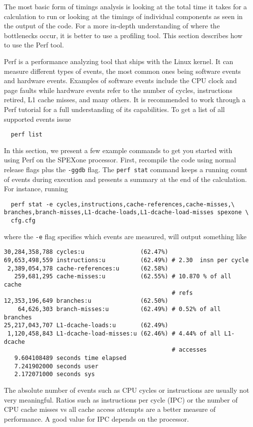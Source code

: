 \documentclass{article}
\begin{document}
The most basic form of timings analysis is looking at the total time it takes for a calculation to run or looking at the timings of individual components as seen in the output of the code. For a more in-depth understanding of where the bottlenecks occur, it is better to use a profiling tool. This section describes how to use the Perf tool.

Perf is a performance analyzing tool that ships with the Linux kernel. It can measure different types of events, the most common ones being software events and hardware events. Examples of software events include the CPU clock and page faults while hardware events refer to the number of cycles, instructions retired, L1 cache misses, and many others. It is recommended to work through a Perf tutorial for a full understanding of its capabilities. To get a list of all supported events issue
\begin{lstlisting}
  perf list
\end{lstlisting}
In this section, we present a few example commands to get you started with using Perf on the SPEXone processor. First, recompile the code using normal release flags plus the \lstinline!-ggdb! flag. The \lstinline!perf stat! command keeps a running count of events during execution and presents a summary at the end of the calculation. For instance, running
\begin{lstlisting}
  perf stat -e cycles,instructions,cache-references,cache-misses,\
branches,branch-misses,L1-dcache-loads,L1-dcache-load-misses spexone \
  cfg.cfg
\end{lstlisting}
where the \lstinline!-e! flag specifies which events are measured, will output something like
\small
\begin{verbatim}
30,284,358,788 cycles:u                (62.47%)
69,653,498,559 instructions:u          (62.49%) # 2.30  insn per cycle
 2,389,054,378 cache-references:u      (62.58%)
   259,681,295 cache-misses:u          (62.55%) # 10.870 % of all cache
                                                # refs
12,353,196,649 branches:u              (62.50%)
    64,626,303 branch-misses:u         (62.49%) # 0.52% of all branches
25,217,043,707 L1-dcache-loads:u       (62.49%)
 1,120,458,843 L1-dcache-load-misses:u (62.46%) # 4.44% of all L1-dcache
                                                # accesses
   9.604108489 seconds time elapsed
   7.241902000 seconds user
   2.172071000 seconds sys
\end{verbatim}
\normalsize
The absolute number of events such as CPU cycles or instructions are usually not very meaningful. Ratios such as instructions per cycle (IPC) or the number of CPU cache misses vs all cache access attempts are a better measure of performance. A good value for IPC depends on the processor.
\end{document}
